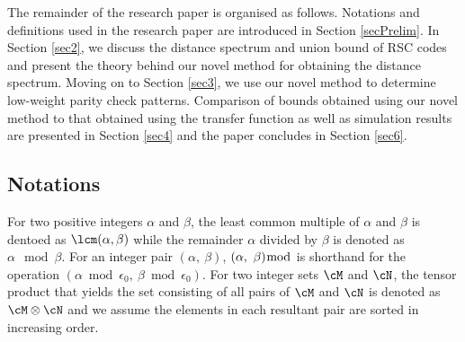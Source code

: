 The remainder of the research paper is organised as follows. Notations and definitions used in the research paper are introduced in Section \ref{secPrelim}. In Section \ref{sec2}, we discuss the distance spectrum and union bound of RSC codes and present the theory behind our novel method for obtaining the distance spectrum. Moving on to Section \ref{sec3}, we use our novel method to determine low-weight parity check patterns. Comparison of bounds obtained using our novel method to that obtained using the transfer function as well as  simulation results are presented in Section \ref{sec4} and the paper concludes in Section \ref{sec6}.

\subsection{Notations}

For two positive integers $\alpha$ and $\beta$, the least common multiple of $\alpha$ and $\beta$ is dentoed as $\lcm(\alpha,\beta)$ while the remainder $\alpha$ divided by $\beta$ is denoted as $\alpha \mod \beta$. For an integer pair $(\alpha,~\beta)$, $(\alpha,~\beta) \bmod $ is shorthand for the operation $(\alpha \bmod \epsilon_0,~\beta \bmod \epsilon_0)$. For two integer sets $\cM$ and $\cN$, the tensor product that yields the set consisting of all pairs of $\cM$ and $\cN$ is denoted as $\cM \otimes \cN$ and we assume the elements in each resultant pair are sorted in increasing order. 


